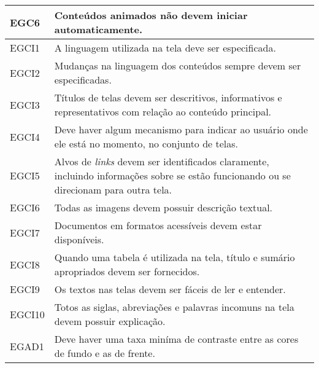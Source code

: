 \begin{table}[htb]
\begin{center}
\begin{tabular}{p{1.0cm}|p{13.0cm}}
      \hline
      EGC6            & Conteúdos animados não devem iniciar automaticamente.                                                                                        \\
      \hline
      EGCI1           & A linguagem utilizada na tela deve ser especificada.                                                                                         \\
      \hline
      EGCI2           & Mudanças na linguagem dos conteúdos sempre devem ser especificadas.                                                                          \\
      \hline
      EGCI3           & Títulos de telas devem ser descritivos, informativos e representativos com relação ao conteúdo principal.                                    \\
      \hline
      EGCI4           & Deve haver algum mecanismo para indicar ao usuário onde ele está no momento, no conjunto de telas.                                           \\
      \hline
      EGCI5           & Alvos de \emph{links} devem ser identificados claramente, incluindo informações sobre se estão funcionando ou se direcionam para outra tela. \\
      \hline
      EGCI6           & Todas as imagens devem possuir descrição textual.                                                                                            \\
      \hline
      EGCI7           & Documentos em formatos acessíveis devem estar disponíveis.                                                                                   \\
      \hline
      EGCI8           & Quando uma tabela é utilizada na tela, título e sumário apropriados devem ser fornecidos.                                                    \\
      \hline
      EGCI9           & Os textos nas telas devem ser fáceis de ler e entender.                                                                                      \\
      \hline
      EGCI10          & Totos as siglas, abreviações e palavras incomuns na tela devem possuir explicação.                                                           \\
      \hline
      EGAD1           & Deve haver uma taxa miníma de contraste entre as cores de fundo e as de frente.                                                              \\

\end{tabular}
\end{center}
\end{table}
